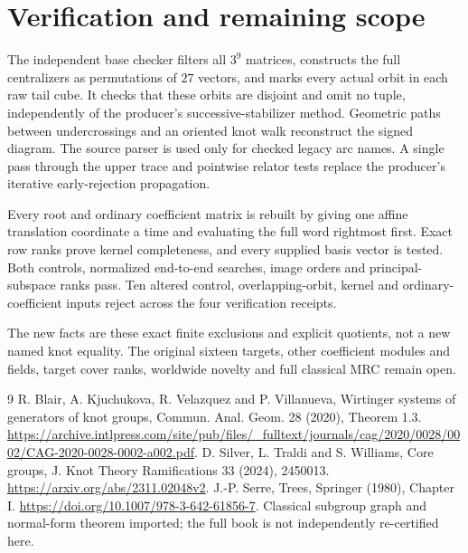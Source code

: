 \documentclass[11pt]{article}
\begin{document}
\clearpage
\section{Verification and remaining scope}

The independent base checker filters all $3^9$ matrices,
constructs the full centralizers as permutations of $27$
vectors, and marks every actual orbit in each raw tail cube.
It checks that these orbits are disjoint and omit no tuple,
independently of the producer's successive-stabilizer method.
Geometric paths between undercrossings and an oriented knot
walk reconstruct the signed diagram. The source parser is
used only for checked legacy arc names. A single pass through
the upper trace and pointwise relator tests replace the
producer's iterative early-rejection propagation.

Every root and ordinary coefficient matrix is rebuilt by
giving one affine translation coordinate a time and evaluating
the full word rightmost first. Exact row ranks prove kernel
completeness, and every supplied basis vector is tested.
Both controls, normalized end-to-end searches, image orders
and principal-subspace ranks pass. Ten altered control,
overlapping-orbit, kernel and ordinary-coefficient inputs
reject across the four verification receipts.

The new facts are these exact finite exclusions and explicit
quotients, not a new named knot equality. The original sixteen
targets, other coefficient modules and fields, target cover
ranks, worldwide novelty and full classical MRC remain open.

\begin{thebibliography}{9}
\small
{} R. Blair, A. Kjuchukova, R. Velazquez and P.
Villanueva, Wirtinger systems of generators of knot groups,
Commun. Anal. Geom. 28 (2020), Theorem 1.3.
\url{https://archive.intlpress.com/site/pub/files/_fulltext/journals/cag/2020/0028/0002/CAG-2020-0028-0002-a002.pdf}.
 D. Silver, L. Traldi and S. Williams, Core
groups, J. Knot Theory Ramifications 33 (2024), 2450013.
\url{https://arxiv.org/abs/2311.02048v2}.
 J.-P. Serre, Trees, Springer (1980), Chapter I.
\url{https://doi.org/10.1007/978-3-642-61856-7}.
Classical subgroup graph and normal-form theorem imported;
the full book is not independently re-certified here.
\end{thebibliography}
\end{document}
